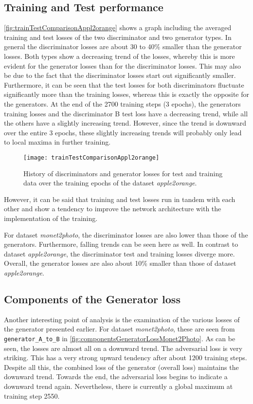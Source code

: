 \documentclass[fleqn,10pt]{SelfArx} %
\begin{document}
\subsection{Training and Test performance}
\autoref{fig:trainTestComparisonAppl2orange} shows a graph including the averaged training and test losses of the two discriminator and two generator types. In general the discriminator losses are about 30 to 40\% smaller than the generator losses. Both types show a decreasing trend of the losses, whereby this is more evident for the generator losses than for the discriminator losses. This may also be due to the fact that the discriminator losses start out significantly smaller. Furthermore, it can be seen that the test losses for both discriminators fluctuate significantly more than the training losses, whereas this is exactly the opposite for the generators. At the end of the 2700 training steps (3 epochs), the generators training losses and the discriminator B test loss have a decreasing trend, while all the others have a slightly increasing trend. However, since the trend is downward over the entire 3 epochs, these slightly increasing trends will probably only lead to local maxima in further training.

\begin{figure}[htb] 
	\centering 
	\texttt{[image: trainTestComparisonAppl2orange]}
	\caption{History of discriminators and generator losses for test and training data over the training epochs of the dataset \textit{apple2orange}.}
	\label{fig:trainTestComparisonAppl2orange}
\end{figure}

However, it can be said that training and test losses run in tandem with each other and show a tendency to improve the network architecture with the implementation of the training.

For dataset \textit{monet2photo}, the discriminator losses are also lower than those of the generators. Furthermore, falling trends can be seen here as well. In contrast to dataset \textit{apple2orange}, the discriminator test and training losses diverge more. Overall, the generator losses are also about 10\% smaller than those of dataset \textit{apple2orange}.

\subsection{Components of the Generator loss}
Another interesting point of analysis is the examination of the various losses of the generator presented earlier. For dataset \textit{monet2photo}, these are seen from \texttt{generator\_A\_to\_B} in \autoref{fig:componentsGeneratorLossMonet2Photo}. As can be seen, the losses are almost all on a downward trend. The adversarial loss is very striking. This has a very strong upward tendency after about 1200 training steps. Despite all this, the combined loss of the generator (overall loss) maintains the downward trend. Towards the end, the adversarial loss begins to indicate a downward trend again. Nevertheless, there is currently a global maximum at training step 2550.
\end{document}
